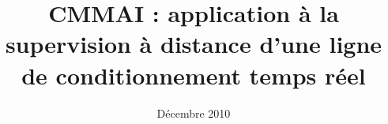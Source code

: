 \documentclass[a4paper]{report}
\title{CMMAI : application à la supervision à distance d'une ligne de conditionnement temps réel}
\date{Décembre 2010}
\begin{document}
\maketitle

\vfill
\pagebreak

\tableofcontents

\vfill
\pagebreak

	
\end{document}
